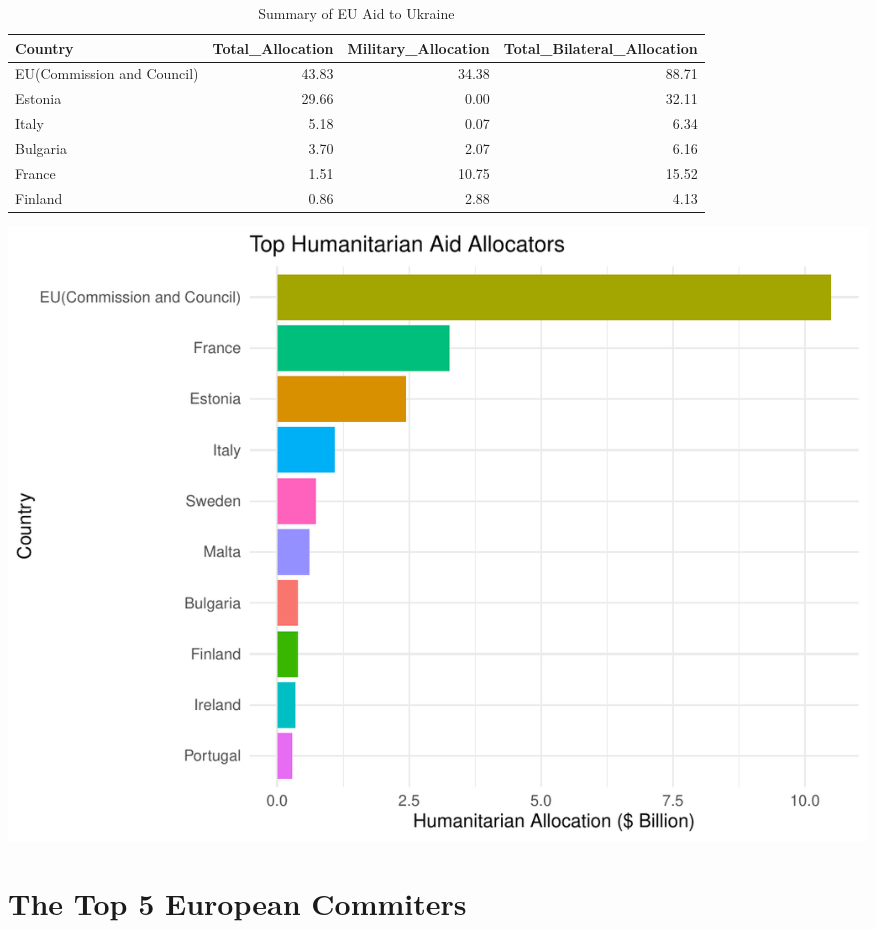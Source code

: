 \documentclass[12pt,preprint, authoryear]{elsarticle}
\let\origfigure\figure
\let\endorigfigure\endfigure
\renewenvironment{figure}[1][2] {
    \expandafter\origfigure\expandafter[H]
} {
    \endorigfigure
}
\numberwithin{equation}{section}
\numberwithin{figure}{section}
\numberwithin{table}{section}
\begin{document}
\begingroup\fontsize{12pt}{13pt}\selectfont
\begin{longtable}{lrrr}
\caption{Summary of EU Aid to Ukraine \label{tab1}} \\ 
  \toprule
Country & Total\_Allocation & Military\_Allocation & Total\_Bilateral\_Allocation \\ 
  \midrule
EU(Commission and Council) & 43.83 & 34.38 & 88.71 \\ 
  Estonia & 29.66 & 0.00 & 32.11 \\ 
  Italy & 5.18 & 0.07 & 6.34 \\ 
  Bulgaria & 3.70 & 2.07 & 6.16 \\ 
  France & 1.51 & 10.75 & 15.52 \\ 
  Finland & 0.86 & 2.88 & 4.13 \\ 
   \bottomrule
\end{longtable}
\endgroup

\begin{figure}

{\centering \includegraphics{README_files/figure-latex/unnamed-chunk-1-1} 

}

\caption{Top 10 EU Countries Humanitarian Commitments to Ukraine\label{Figure1}}\label{fig:unnamed-chunk-1}
\end{figure}

\hypertarget{the-top-5-european-commiters}{%
\section{The Top 5 European
Commiters}\label{the-top-5-european-commiters}}
\end{document}

